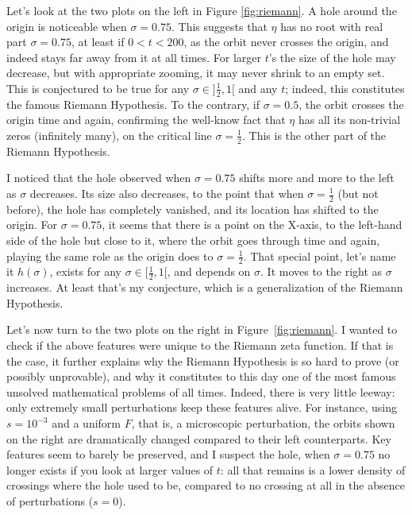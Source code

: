 \documentclass[10pt]{article}
\begin{document}
Let's look at the two plots on the left in Figure \ref{fig:riemann}. A hole around the origin is noticeable when $\sigma=0.75$. This suggests that $\eta$ has no root with real part $\sigma=0.75$, at least if $0<t<200$, as the orbit never crosses the origin, and indeed stays far away from it at all times. For larger $t$'s the size of the hole may decrease, but with appropriate zooming, it may never shrink to an empty set. This is conjectured to be true for any $\sigma\in ]\frac{1}{2}, 1[$ and any $t$; indeed, this constitutes the famous \textcolor{index}{Riemann Hypothesis}. To the contrary, if $\sigma=0.5$, the orbit crosses the origin time and again, confirming the well-know fact that $\eta$ has all its non-trivial zeros (infinitely many), on the critical line $\sigma=\frac{1}{2}$. This is the other part of the Riemann Hypothesis.

I noticed that the hole observed when $\sigma=0.75$ shifts more and more to the left as $\sigma$ decreases. Its size also decreases, to the point that when $\sigma=\frac{1}{2}$ (but not before), the hole has completely vanished, and its location has shifted to the origin. For $\sigma=0.75$, it seems that there is a point on the X-axis, to the left-hand side of the hole but close to it, where the orbit goes through time and again, playing the same role as the origin does to $\sigma=\frac{1}{2}$. That special point, let's name it $h(\sigma)$, exists for any $\sigma\in[\frac{1}{2},1[$, and depends on $\sigma$. It moves to the right as $\sigma$ increases. At least that's my conjecture, which is a generalization of the Riemann Hypothesis.

Let's now turn to the two plots on the right in Figure~\ref{fig:riemann}. I wanted to check if the above features were unique to the Riemann zeta function. If that is the case, it further explains why the Riemann Hypothesis is so hard to prove (or possibly unprovable), and why it constitutes to this day one of the most famous unsolved mathematical problems of all times. Indeed, there is very little leeway: only extremely small perturbations keep these features alive. For instance, using $s=10^{-3}$ and a uniform $F$, that is, a microscopic perturbation, the orbits shown on the right are dramatically changed compared to their left counterparts. Key features seem to barely be preserved, and I suspect the hole, when $\sigma=0.75$ no longer exists if you look at larger values of $t$: all that remains is a lower density of crossings where the hole used to be, compared to no crossing at all in the absence of perturbations ($s=0$).
\end{document}
